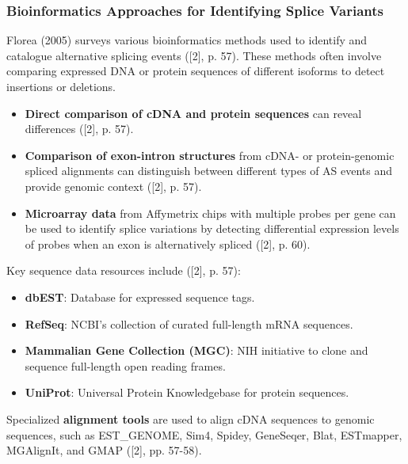 \documentclass[12pt,a4paper]{article}
\begin{document}
\subsubsection{Bioinformatics Approaches for Identifying Splice Variants}

Florea (2005) surveys various bioinformatics methods used to identify and catalogue alternative splicing events ([2], p. 57). These methods often involve comparing expressed DNA or protein sequences of different isoforms to detect insertions or deletions.
\begin{itemize}
    \item \textbf{Direct comparison of cDNA and protein sequences} can reveal differences ([2], p. 57).
    \item \textbf{Comparison of exon-intron structures} from cDNA- or protein-genomic spliced alignments can distinguish between different types of AS events and provide genomic context ([2], p. 57).
    \item \textbf{Microarray data} from Affymetrix chips with multiple probes per gene can be used to identify splice variations by detecting differential expression levels of probes when an exon is alternatively spliced ([2], p. 60).
\end{itemize}

Key sequence data resources include ([2], p. 57):
\begin{itemize}
    \item \textbf{dbEST}: Database for expressed sequence tags.
    \item \textbf{RefSeq}: NCBI's collection of curated full-length mRNA sequences.
    \item \textbf{Mammalian Gene Collection (MGC)}: NIH initiative to clone and sequence full-length open reading frames.
    \item \textbf{UniProt}: Universal Protein Knowledgebase for protein sequences.
\end{itemize}

Specialized \textbf{alignment tools} are used to align cDNA sequences to genomic sequences, such as EST\_GENOME, Sim4, Spidey, GeneSeqer, Blat, ESTmapper, MGAlignIt, and GMAP ([2], pp. 57-58).
\end{document}
